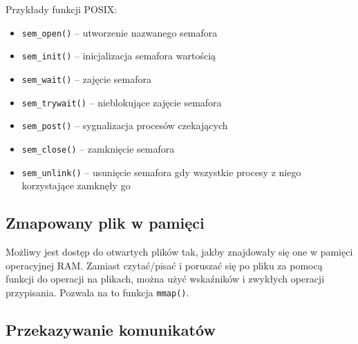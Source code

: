 Przykłady funkcji POSIX:
\begin{itemize}
	\item \texttt{sem\_open()} -- utworzenie nazwanego semafora
    \item \texttt{sem\_init()} -- inicjalizacja semafora wartością
    \item \texttt{sem\_wait()} -- zajęcie semafora
    \item \texttt{sem\_trywait()} -- nieblokujące zajęcie semafora
    \item \texttt{sem\_post()} -- sygnalizacja procesów czekających
    \item \texttt{sem\_close()} -- zamknięcie semafora
    \item \texttt{sem\_unlink()} -- usunięcie semafora gdy wszystkie procesy z niego korzystające zamknęły go
\end{itemize}

\subsection{Zmapowany plik w pamięci}

Możliwy jest dostęp do otwartych plików tak, jakby znajdowały się one w pamięci operacyjnej RAM. Zamiast czytać/pisać i poruszać się po pliku za pomocą funkcji do operacji na plikach, można użyć wskaźników i zwykłych operacji przypisania. Pozwala na to funkcja \texttt{mmap()}.

\subsection{Przekazywanie komunikatów}

